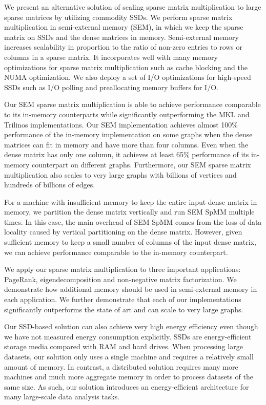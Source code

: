 We present an alternative solution of scaling sparse matrix multiplication
to large sparse matrices by utilizing commodity SSDs.
We perform sparse matrix multiplication in semi-external memory (SEM), in which
we keep the sparse matrix on SSDs and the dense matrices in memory. Semi-external
memory increases scalability in proportion to the ratio of non-zero entries
to rows or columns in a sparse matrix. It incorporates well with many memory
optimizations for sparse matrix multiplication such as cache blocking and the NUMA
optimization. We also deploy a set of I/O optimizations for high-speed SSDs
such as I/O polling and preallocating memory buffers for I/O.

Our SEM sparse matrix multiplication is able to achieve performance comparable
to its in-memory counterparts while significantly outperforming the MKL and
Trilinos implementations. Our SEM implementation achieves almost 100\% performance
of the in-memory implementation on some graphs when the dense matrices can fit
in memory and have more than four columns. Even when the dense matrix has only
one column, it achieves at least 65\% performance of its in-memory counterpart
on different graphs. Furthermore, our SEM sparse matrix multiplication also
scales to very large graphs with billions of vertices and hundreds of billions
of edges.

For a machine with insufficient memory to keep the entire input dense matrix
in memory, we partition the dense matrix vertically and run SEM SpMM multiple
times. In this case, the main overhead of SEM SpMM comes from the loss of
data locality caused by vertical partitioning on the dense matrix. However,
given sufficient memory to keep a small number of columns of the input dense
matrix, we can achieve performance comparable to the in-memory counterpart.

We apply our sparse matrix multiplication to three important applications:
PageRank, eigendecomposition and non-negative matrix factorization. We demonstrate
how additional memory should be used in semi-external memory in each application.
We further demonstrate that each of our implementations significantly outperforms
the state of art and can scale to very large graphs.

Our SSD-based solution can also achieve very high energy efficiency even though
we have not measured energy consumption explicitly. SSDs are energy-efficient
storage media \cite{} compared with RAM and hard drives. When processing large
datasets, our solution only uses
a single machine and requires a relatively small amount of memory. In contrast,
a distributed solution requires many more machines and much more aggregate
memory in order to process datasets of the same size. As such, our solution
introduces an energy-efficient architecture for many large-scale data analysis
tasks.
